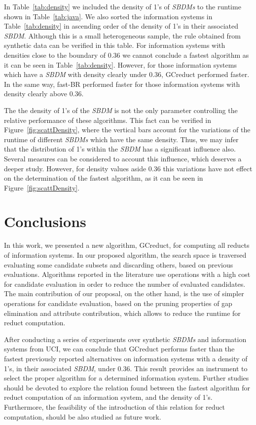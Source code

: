 \documentclass[number,preprint,review,12pt]{elsarticle}
\begin{document}
	In Table~\ref{tab:density} we included the density of 1's of \textit{SBDMs} to the runtime shown in Table~\ref{tab:java}. We also sorted the information systems in Table~\ref{tab:density} in ascending order of the density of 1's in their associated \textit{SBDM}. Although this is a small heterogeneous sample, the rule obtained from synthetic data can be verified in this table. For information systems with densities close to the boundary of 0.36 we cannot conclude a fastest algorithm as it can be seen in Table~\ref{tab:density}. However, for those information systems which have a \textit{SBDM} with density clearly under 0.36, GCreduct performed faster. In the same way, fast-BR performed faster for those information systems with density clearly above 0.36.
	
	The the density of 1's of the \textit{SBDM} is not the only parameter controlling the relative performance of these algorithms. This fact can be verified in Figure~\ref{fig:scattDensity}, where the vertical bars account for the variations of the runtime of different \textit{SBDMs} which have the same density. Thus, we may infer that the distribution of 1's within the \textit{SBDM} has a significant influence also. Several measures can be considered to account this influence, which deserves a deeper study. However, for density values aside 0.36 this variations have not effect on the determination of the fastest algorithm, as it can be seen in Figure~\ref{fig:scattDensity}. 

\section{Conclusions}\label{conclusions}
	In this work, we presented a new algorithm, GCreduct, for computing all reducts of information systems. In our proposed algorithm, the search space is traversed evaluating some candidate subsets and discarding others, based on previous evaluations. Algorithms reported in the literature use operations with a high cost for candidate evaluation in order to reduce the number of evaluated candidates. The main contribution of our proposal, on the other hand, is the use of simpler operations for candidate evaluation, based on the pruning properties of gap elimination and attribute contribution, which allows to reduce the runtime for reduct computation. 
	
	After conducting a series of experiments over synthetic \textit{SBDMs} and information systems from UCI, we can conclude that GCreduct performs faster than the fastest previously reported alternatives on information systems with a density of 1's, in their associated \textit{SBDM}, under 0.36. This result provides an instrument to select the proper algorithm for a determined information system. Further studies should be devoted to explore the relation found between the fastest algorithm for reduct computation of an information system, and the density of 1's. Furthermore, the feasibility of the introduction of this relation for reduct computation, should be also studied as future work.
\end{document}
